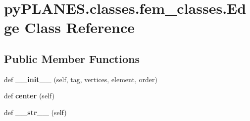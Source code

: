 \hypertarget{classpy_p_l_a_n_e_s_1_1classes_1_1fem__classes_1_1_edge}{}\section{py\+P\+L\+A\+N\+E\+S.\+classes.\+fem\+\_\+classes.\+Edge Class Reference}
\label{classpy_p_l_a_n_e_s_1_1classes_1_1fem__classes_1_1_edge}
\subsection*{Public Member Functions}
\begin{DoxyCompactItemize}
\item 
\mbox{\label{classpy_p_l_a_n_e_s_1_1classes_1_1fem__classes_1_1_edge_a530f7d59969ae0b371903b5ac0354587}} 
def {\bfseries \+\_\+\+\_\+init\+\_\+\+\_\+} (self, tag, vertices, element, order)
\item 
\mbox{\label{classpy_p_l_a_n_e_s_1_1classes_1_1fem__classes_1_1_edge_a8547d3032b0510e1565b008f68786b70}} 
def {\bfseries center} (self)
\item 
\mbox{\label{classpy_p_l_a_n_e_s_1_1classes_1_1fem__classes_1_1_edge_a64358a0be626f48dcbd46be2fff2e393}} 
def {\bfseries \+\_\+\+\_\+str\+\_\+\+\_\+} (self)
\end{DoxyCompactItemize}

